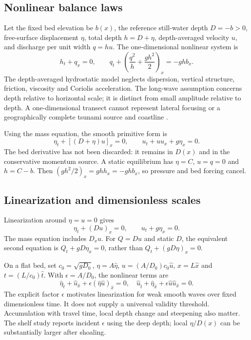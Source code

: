 \documentclass[11pt]{article}
\begin{document}
\subsection{Nonlinear balance laws}
Let the fixed bed elevation be $b(x)$, the reference still-water depth $D=-b>0$,
free-surface displacement $\eta$, total depth $h=D+\eta$, depth-averaged velocity
$u$, and discharge per unit width $q=hu$. The one-dimensional nonlinear system is
\begin{equation}
 h_t+q_x=0,\qquad
 q_t+\left(\frac{q^2}{h}+\frac{gh^2}{2}\right)_x=-ghb_x.
 \label{eq:nl}
\end{equation}
The depth-averaged hydrostatic model neglects dispersion, vertical structure,
friction, viscosity and Coriolis acceleration. The long-wave assumption concerns
depth relative to horizontal scale; it is distinct from small amplitude relative
to depth. A one-dimensional transect cannot represent lateral focusing or a
geographically complete tsunami source and coastline \cite{riemann}.

Using the mass equation, the smooth primitive form is
\begin{equation}
 \eta_t+[(D+\eta)u]_x=0,\qquad u_t+u u_x+g\eta_x=0.
\end{equation}
The bed derivative has not been discarded: it remains in $D(x)$ and in the
conservative momentum source. A static equilibrium has $\eta=C$, $u=q=0$ and
$h=C-b$. Then $(gh^2/2)_x=ghh_x=-ghb_x$, so pressure and bed forcing cancel.

\subsection{Linearization and dimensionless scales}
Linearization around $\eta=u=0$ gives
\begin{equation}
 \eta_t+(Du)_x=0,\qquad u_t+g\eta_x=0. \label{eq:linear}
\end{equation}
The mass equation includes $D_xu$. For $Q=Du$ and static $D$, the equivalent
second equation is $Q_t+gD\eta_x=0$, rather than $Q_t+(gD\eta)_x=0$.

On a flat bed, set $c_0=\sqrt{gD_0}$, $\eta=A\widehat\eta$,
$u=(A/D_0)c_0\widehat u$, $x=L\widehat x$ and $t=(L/c_0)\widehat t$.
With $\epsilon=A/D_0$, the nonlinear terms are
\begin{equation}
 \widehat\eta_{\widehat t}+\widehat u_{\widehat x}
 +\epsilon(\widehat\eta\widehat u)_{\widehat x}=0,\quad
 \widehat u_{\widehat t}+\widehat\eta_{\widehat x}
 +\epsilon\widehat u\widehat u_{\widehat x}=0.
\end{equation}
The explicit factor $\epsilon$ motivates linearization for weak smooth waves over
fixed dimensionless time. It does not supply a universal validity threshold.
Accumulation with travel time, local depth change and steepening also matter.
The shelf study reports incident $\epsilon$ using the deep depth; local
$\eta/D(x)$ can be substantially larger after shoaling.
\end{document}
